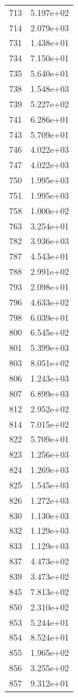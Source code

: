 \documentclass[12pt]{article}
\begin{document}
\begin{longtable}{@{}cc@{}}
713 & 5.197e+02 \\
714 & 2.079e+03 \\
731 & 1.438e+01 \\
734 & 7.150e+01 \\
735 & 5.640e+01 \\
738 & 1.548e+03 \\
739 & 5.227e+02 \\
741 & 6.286e+01 \\
743 & 5.709e+01 \\
746 & 4.022e+03 \\
747 & 4.022e+03 \\
750 & 1.995e+03 \\
751 & 1.995e+03 \\
758 & 1.000e+02 \\
763 & 3.254e+01 \\
782 & 3.936e+03 \\
787 & 4.543e+01 \\
788 & 2.991e+02 \\
793 & 2.098e+01 \\
796 & 4.633e+02 \\
798 & 6.039e+01 \\
800 & 6.545e+02 \\
801 & 5.399e+03 \\
803 & 8.051e+02 \\
806 & 1.243e+03 \\
807 & 6.899e+03 \\
812 & 2.952e+02 \\
814 & 7.015e+02 \\
822 & 5.709e+01 \\
823 & 1.256e+03 \\
824 & 1.269e+03 \\
825 & 1.545e+03 \\
826 & 1.272e+03 \\
830 & 1.130e+03 \\
832 & 1.129e+03 \\
833 & 1.129e+03 \\
837 & 4.473e+02 \\
839 & 3.473e+02 \\
845 & 7.813e+02 \\
850 & 2.310e+02 \\
853 & 5.244e+01 \\
854 & 8.524e+01 \\
855 & 1.965e+02 \\
856 & 3.255e+02 \\
857 & 9.312e+01 \\

\end{longtable}
\end{document}

